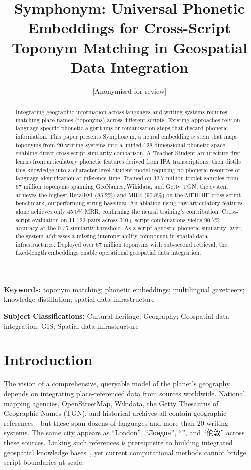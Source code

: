 \documentclass[11pt,a4paper]{article}
\title{Symphonym: Universal Phonetic Embeddings for Cross-Script Toponym Matching in Geospatial Data Integration}
\author{[Anonymised for review]}
\date{}
\newcommand{\textar}[1]{{\arabicfont\RL{#1}}}
\newcommand{\textcn}[1]{{\chinesefont #1}}
\begin{document}
\maketitle

\begin{abstract}
Integrating geographic information across languages and writing systems requires matching place names (toponyms) across different scripts. Existing approaches rely on language-specific phonetic algorithms or romanisation steps that discard phonetic information. This paper presents Symphonym, a neural embedding system that maps toponyms from 20 writing systems into a unified 128-dimensional phonetic space, enabling direct cross-script similarity comparison. A Teacher-Student architecture first learns from articulatory phonetic features derived from IPA transcriptions, then distils this knowledge into a character-level Student model requiring no phonetic resources or language identification at inference time. Trained on 32.7 million triplet samples from 67 million toponyms spanning GeoNames, Wikidata, and Getty TGN, the system achieves the highest Recall@1 (85.2\%) and MRR (90.8\%) on the MEHDIE cross-script benchmark, outperforming string baselines. An ablation using raw articulatory features alone achieves only 45.0\% MRR, confirming the neural training's contribution. Cross-script evaluation on 11,723 pairs across 170+ script combinations yields 90.7\% accuracy at the 0.75 similarity threshold. As a script-agnostic phonetic similarity layer, the system addresses a missing interoperability component in spatial data infrastructures. Deployed over 67 million toponyms with sub-second retrieval, the fixed-length embeddings enable operational geospatial data integration.
\end{abstract}

\textbf{Keywords:} toponym matching; phonetic embeddings; multilingual gazetteers; knowledge distillation; spatial data infrastructure

\noindent\textbf{Subject Classifications:} Cultural heritage; Geography; Geospatial data integration; GIS; Spatial data infrastructure


\section{Introduction}
\label{sec:introduction}

The vision of a comprehensive, queryable model of the planet's geography~\citep{goodchild2012digital,guo2020digital} depends on integrating place-referenced data from sources worldwide. National mapping agencies, OpenStreetMap, Wikidata, the Getty Thesaurus of Geographic Names (TGN), and historical archives all contain geographic references---but these span dozens of languages and more than 20 writing systems. The same city appears as ``London'', ``Лондон'', ``\textar{لندن}'', and ``\textcn{伦敦}'' across these sources. Linking such references is prerequisite to building integrated geospatial knowledge bases~\citep{hill2006georeferencing}, yet current computational methods cannot bridge script boundaries at scale.
\end{document}
